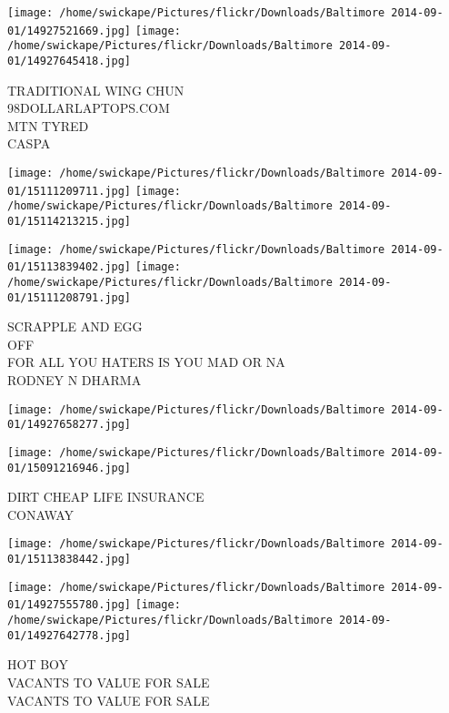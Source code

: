 \documentclass[10pt,letterpaper]{article}
\begin{document}
\texttt{[image: /home/swickape/Pictures/flickr/Downloads/Baltimore 2014-09-01/14927521669.jpg]}
\texttt{[image: /home/swickape/Pictures/flickr/Downloads/Baltimore 2014-09-01/14927645418.jpg]}

TRADITIONAL WING CHUN\\
98DOLLARLAPTOPS.COM\\
MTN TYRED\\
CASPA\\
\pagebreak

\texttt{[image: /home/swickape/Pictures/flickr/Downloads/Baltimore 2014-09-01/15111209711.jpg]}
\texttt{[image: /home/swickape/Pictures/flickr/Downloads/Baltimore 2014-09-01/15114213215.jpg]}

\texttt{[image: /home/swickape/Pictures/flickr/Downloads/Baltimore 2014-09-01/15113839402.jpg]}
\texttt{[image: /home/swickape/Pictures/flickr/Downloads/Baltimore 2014-09-01/15111208791.jpg]}

SCRAPPLE AND EGG\\
OFF\\
FOR ALL YOU HATERS IS YOU MAD OR NA\\
RODNEY N DHARMA\\
\pagebreak

\texttt{[image: /home/swickape/Pictures/flickr/Downloads/Baltimore 2014-09-01/14927658277.jpg]}

\vspace{0.25in}
\texttt{[image: /home/swickape/Pictures/flickr/Downloads/Baltimore 2014-09-01/15091216946.jpg]}

DIRT CHEAP LIFE INSURANCE\\
CONAWAY\\
\pagebreak

\texttt{[image: /home/swickape/Pictures/flickr/Downloads/Baltimore 2014-09-01/15113838442.jpg]}

\vspace{0.25in}
\texttt{[image: /home/swickape/Pictures/flickr/Downloads/Baltimore 2014-09-01/14927555780.jpg]}
\texttt{[image: /home/swickape/Pictures/flickr/Downloads/Baltimore 2014-09-01/14927642778.jpg]}

HOT BOY\\
VACANTS TO VALUE FOR SALE\\
VACANTS TO VALUE FOR SALE\\
\pagebreak
\end{document}
